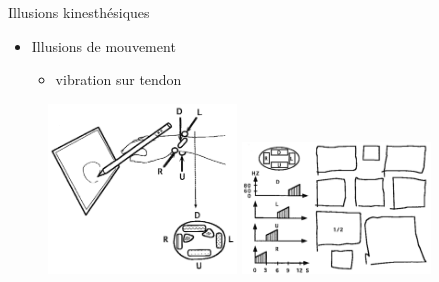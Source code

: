 \documentclass[compress, noflama]{beamer}
\begin{document}
{
\begin{frame}{Illusions kinesthésiques}
\begin{itemize}
\item Illusions de mouvement
\begin{itemize}
\item vibration sur tendon
\end{itemize}
\end{itemize}
\begin{figure}
\centering
\includegraphics[width=5cm]{images/vibrationmovement}
\includegraphics[width=5cm]{images/vibrationmovement2}
\end{figure}
\end{frame}
}
\end{document}
